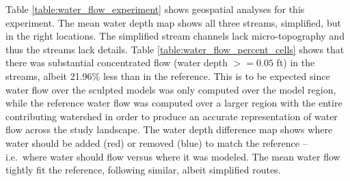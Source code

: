 \documentclass[prodmode,acmtochi]{acmsmall} %
\begin{document}
Table \ref{table:water_flow_experiment} shows geospatial analyses for this experiment.
The mean water depth map shows all three streams, 
simplified, but in the right locations. 
The simplified stream channels lack micro-topography
and thus the streams lack details. 
Table \ref{table:water_flow_percent_cells} shows that 
there was substantial concentrated flow (water depth $>=0.05$ ft) 
in the streams, albeit 21.96\% less than in the reference.
%
This is to be expected 
since 
water flow over the sculpted models was only computed over the model region, 
while 
the reference water flow 
was computed over a larger region 
with the entire contributing watershed 
in order to produce an accurate representation 
of water flow across the study landscape. 
%
The water depth difference map shows
where water should be added (red) or removed (blue) 
to match the reference
-- i.e.~where water should flow versus where it was modeled. 
%
The mean water flow tightly fit the reference, 
following similar, albeit simplified routes.
\end{document}
